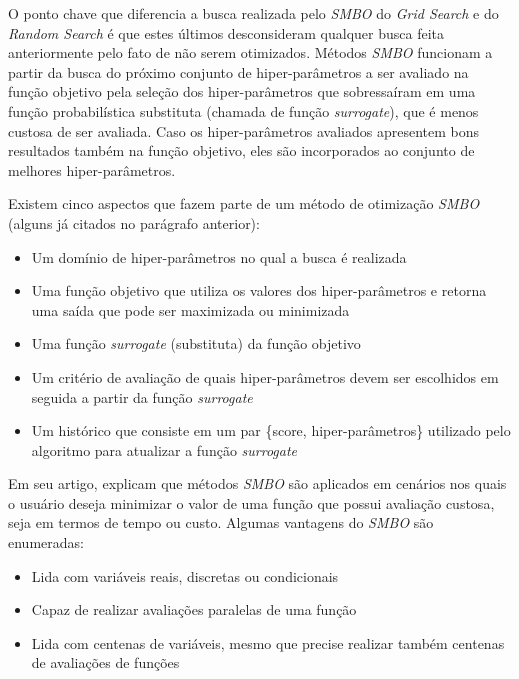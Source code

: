 \documentclass[
12pt,				%
openright,			%
oneside,			%
a4paper,			%
english,			%
french,				%
spanish,			%
brazil				%
]{abntex2}
\begin{document}
O ponto chave que diferencia a busca realizada pelo \textit{SMBO} do \textit{Grid Search} e do \textit{Random Search} é que estes últimos desconsideram qualquer busca feita anteriormente pelo fato de não serem otimizados. Métodos \textit{SMBO} funcionam a partir da busca do próximo conjunto de hiper-parâmetros a ser avaliado na função objetivo pela seleção dos hiper-parâmetros que sobressaíram em uma função probabilística substituta (chamada de função \textit{surrogate}), que é menos custosa de ser avaliada. Caso os hiper-parâmetros avaliados apresentem bons resultados também na função objetivo, eles são incorporados ao conjunto de melhores hiper-parâmetros.

Existem cinco aspectos que fazem parte de um método de otimização \textit{SMBO} (alguns já citados no parágrafo anterior):

\begin{itemize}
    \item Um domínio de hiper-parâmetros no qual a busca é realizada
    \item Uma função objetivo que utiliza os valores dos hiper-parâmetros e retorna uma saída que pode ser maximizada ou minimizada
    \item Uma função \textit{surrogate} (substituta) da função objetivo
    \item Um critério de avaliação de quais hiper-parâmetros devem ser escolhidos em seguida a partir da função \textit{surrogate}
    \item Um histórico que consiste em um par \{score, hiper-parâmetros\} utilizado pelo algoritmo para atualizar a função \textit{surrogate}
\end{itemize}

Em seu artigo,  explicam que métodos \textit{SMBO} são aplicados em cenários nos quais o usuário deseja minimizar o valor de uma função que possui avaliação custosa, seja em termos de tempo ou custo. Algumas vantagens do \textit{SMBO} são enumeradas:

\begin{itemize}
    \item Lida com variáveis reais, discretas ou condicionais
    \item Capaz de realizar avaliações paralelas de uma função
    \item Lida com centenas de variáveis, mesmo que precise realizar também centenas de avaliações de funções
\end{itemize}
\end{document}
